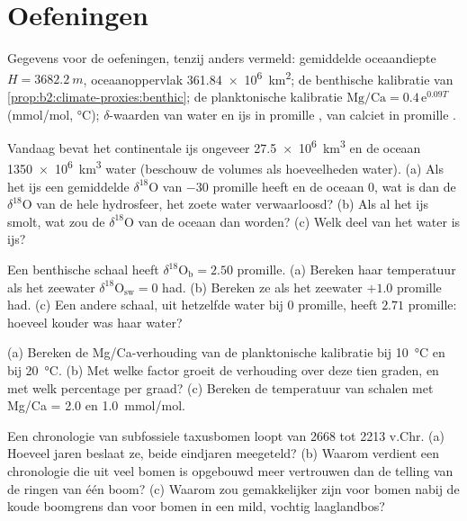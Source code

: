 \section*{Oefeningen}\label{sec:b2:climate-proxies:exercises}

Gegevens voor de oefeningen, tenzij anders vermeld: gemiddelde oceaandiepte $H = \qty{3682.2}{m}$,
oceaanoppervlak \qty{361.84e6}{km^2}; de benthische kalibratie van \cref{prop:b2:climate-proxies:benthic}; de
planktonische kalibratie $\text{Mg/Ca} = 0.4\,\mathrm{e}^{0.09T}$ (\unit{mmol/mol}, \unit{\celsius});
$\delta$-waarden van water en ijs in promille , van calciet in promille .

\begin{exercise}[$\star$]\label{exo:b2:climate-proxies:1}
Vandaag bevat het continentale ijs ongeveer \qty{27.5e6}{km^3} en de oceaan \qty{1350e6}{km^3}
water (beschouw de volumes als hoeveelheden water). (a) Als het ijs een gemiddelde $\delta^{18}$O van $-30$
promille heeft en de oceaan 0, wat is dan de $\delta^{18}$O van de hele hydrosfeer, het zoete
water verwaarloosd? (b) Als al het ijs smolt, wat zou de $\delta^{18}$O van de oceaan dan worden? (c) Welk
deel van het water is ijs?
\end{exercise}

\begin{exercise}[$\star$]\label{exo:b2:climate-proxies:2}
Een benthische schaal heeft $\delta^{18}\mathrm{O}_{\mathrm{b}} = 2.50$ promille. (a) Bereken haar
temperatuur als het zeewater $\delta^{18}\mathrm{O}_{\mathrm{sw}} = 0$ had. (b) Bereken ze als het
zeewater $+1.0$ promille had. (c) Een andere schaal, uit hetzelfde water bij $0$ promille, heeft
$2.71$ promille: hoeveel kouder was haar water?
\end{exercise}

\begin{exercise}[$\star$]\label{exo:b2:climate-proxies:3}
(a) Bereken de Mg/Ca-verhouding van de planktonische kalibratie bij \qty{10}{\celsius} en bij
\qty{20}{\celsius}. (b) Met welke factor groeit de verhouding over deze tien graden, en met welk
percentage per graad? (c) Bereken de temperatuur van schalen met Mg/Ca = 2.0 en
\qty{1.0}{mmol/mol}.
\end{exercise}

\begin{exercise}[$\star$]\label{exo:b2:climate-proxies:4}
Een chronologie van subfossiele taxusbomen loopt van 2668 tot 2213 v.Chr. (a) Hoeveel jaren beslaat ze,
beide eindjaren meegeteld? (b) Waarom verdient een chronologie die uit veel bomen is opgebouwd meer vertrouwen dan
de telling van de ringen van één boom? (c) Waarom zou  gemakkelijker zijn voor
bomen nabij de koude boomgrens dan voor bomen in een mild, vochtig laaglandbos?
\end{exercise}

